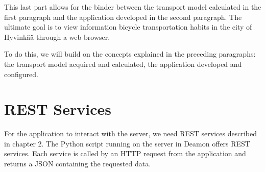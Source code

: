 

This last part allows for the binder between the transport model calculated in the first paragraph and the application developed in the second paragraph. The ultimate goal is to view information bicycle transportation habits in the city of Hyvinkää through a web browser. 

To do this, we will build on the concepts explained in the preceding paragraphs: the transport model acquired and calculated, the application developed and configured.


\section{REST Services}



For the application to interact with the server, we need REST services described in chapter 2. The Python script running on the server in Deamon offers REST services. Each service is called by an HTTP request from the application and returns a JSON containing the requested data.



